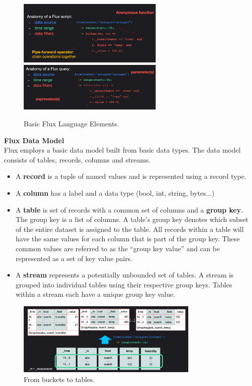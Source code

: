 \documentclass[10pt,a4paper]{article}
\begin{document}
  \begin{figure}[ht!]
 \hfill \includegraphics[width=200pt]{images/flux-basics-1}
 \hspace*{\fill}
 \vspace{0.3em}
 \center
  \hfill \includegraphics[width=200pt]{images/flux-basics-2}
 \hspace*{\fill}
 \caption{Basic Flux Language Elements.}
 \end{figure} 
 \textbf{Flux Data Model} \\
Flux employs a basic data model built from basic data types. The data model consists of tables, records, columns and streams.
\begin{itemize}
	\item A \textbf{record} is a tuple of named values and is represented using a record type.
	\item A \textbf{column} has a label and a data type (bool, int, string, bytes...)
	\item A \textbf{table} is set of records with a common set of columns and a \textbf{group key}. The group key is a list of columns. A table’s group key denotes which subset of the entire dataset is assigned to the table. All records within a table will have the same values for each column that is part of the group key. These common values are referred to as the “group key value” and can be represented as a set of key value pairs.
	\item A \textbf{stream} represents a potentially unbounded set of tables. A stream is grouped into individual tables using their respective group keys. Tables within a stream each have a unique group key value.
\end{itemize}
  \begin{figure}[ht!]
 \hfill \includegraphics[width=250pt]{images/from-bucket-to-tables}
 \hspace*{\fill}
 \caption{From buckets to tables.}
 \end{figure} 
\end{document}
